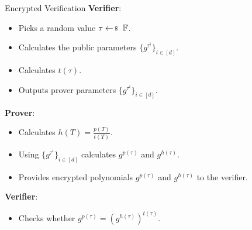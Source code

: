 \documentclass{zkdl-presentation-template}
\begin{document}
    \begin{frame}{Encrypted Verification}
        \textbf{Verifier}:
        \vspace{-5pt}
        \begin{itemize}[label=]
            \item \vspace{-3pt} Picks a random value $\tau \leftarrowS \mathbb{F}$. \pause
            \item \vspace{-3pt} Calculates the public parameters $\{g^{\tau^i}\}_{i \in [d]}$. \pause
            \item \vspace{-3pt} Calculates $t(\tau)$. \pause
            \item \vspace{-3pt} Outputs prover parameters $\{g^{\tau^i}\}_{i \in [d]}$. \pause
        \end{itemize}
        \textbf{Prover}:
        \vspace{-5pt}
        \begin{itemize}[label=]
            \item \vspace{-3pt} Calculates $h(T) = \frac{p(T)}{t(T)}$. \pause
            \item \vspace{-3pt} Using $\{g^{\tau^i}\}_{i \in [d]}$ calculates $g^{p(\tau)}$ and $g^{h(\tau)}$. \pause
            \item \vspace{-3pt} Provides encrypted polynomials $g^{p(\tau)}$ and $g^{h(\tau)}$ to the verifier. \pause
        \end{itemize}
        \textbf{Verifier}:
        \vspace{-5pt}
        \begin{itemize}[label=]
            \item \vspace{-3pt} Checks whether $g^{p(\tau)} = \left( g^{h(\tau)} \right)^{t(\tau)}$.
        \end{itemize}
    \end{frame}
\end{document}
